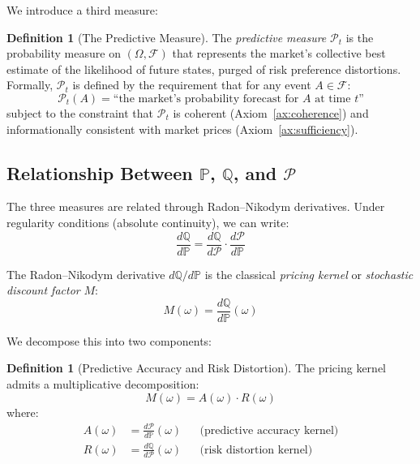 \documentclass[12pt,a4paper]{article}
\theoremstyle{definition}
\newtheorem{definition}[theorem]{Definition}
\newcommand{\Prob}{\mathbb{P}}
\newcommand{\Q}{\mathbb{Q}}
\newcommand{\F}{\mathcal{F}}
\newcommand{\PP}{\mathcal{P}}
\begin{document}
We introduce a third measure:

\begin{definition}[The Predictive Measure]\label{def:predictive_measure}
The \emph{predictive measure} $\PP_t$ is the probability measure on $(\Omega, \F)$ that represents the market's collective best estimate of the likelihood of future states, purged of risk preference distortions. Formally, $\PP_t$ is defined by the requirement that for any event $A \in \F$:
\begin{equation}\label{eq:predictive_def}
    \PP_t(A) = \text{``the market's probability forecast for } A \text{ at time } t\text{''}
\end{equation}
subject to the constraint that $\PP_t$ is coherent (Axiom~\ref{ax:coherence}) and informationally consistent with market prices (Axiom~\ref{ax:sufficiency}).
\end{definition}

\subsection{Relationship Between $\Prob$, $\Q$, and $\PP$}

The three measures are related through Radon--Nikodym derivatives. Under regularity conditions (absolute continuity), we can write:
\begin{equation}\label{eq:radon_nikodym_chain}
    \frac{d\Q}{d\Prob} = \frac{d\Q}{d\PP} \cdot \frac{d\PP}{d\Prob}
\end{equation}

The Radon--Nikodym derivative $d\Q/d\Prob$ is the classical \emph{pricing kernel} or \emph{stochastic discount factor} $M$:
\begin{equation}\label{eq:pricing_kernel}
    M(\omega) = \frac{d\Q}{d\Prob}(\omega)
\end{equation}

We decompose this into two components:

\begin{definition}[Predictive Accuracy and Risk Distortion]\label{def:decomposition}
The pricing kernel admits a multiplicative decomposition:
\begin{equation}\label{eq:kernel_decomposition}
    M(\omega) = A(\omega) \cdot R(\omega)
\end{equation}
where:
\begin{align}
    A(\omega) &= \frac{d\PP}{d\Prob}(\omega) & &\text{(predictive accuracy kernel)} \label{eq:accuracy_kernel} \\
    R(\omega) &= \frac{d\Q}{d\PP}(\omega) & &\text{(risk distortion kernel)} \label{eq:risk_kernel}
\end{align}
\end{definition}
\end{document}
